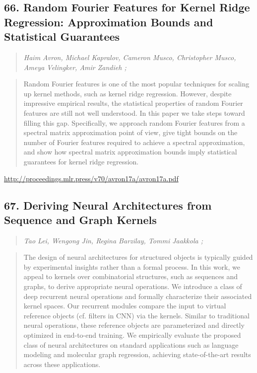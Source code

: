 \documentclass{article}
\begin{document}
\subsection{66. Random Fourier Features for Kernel Ridge Regression: Approximation Bounds and Statistical Guarantees}

\begin{quote}
\footnotesize{\textit{Haim Avron, Michael Kapralov, Cameron Musco, Christopher Musco, Ameya Velingker, Amir Zandieh ;}}

\end{quote}

\begin{quote}
    Random Fourier features is one of the most popular techniques for scaling up kernel methods, such as kernel ridge regression. However, despite impressive empirical results, the statistical properties of random Fourier features are still not well understood. In this paper we take steps toward filling this gap. Specifically, we approach random Fourier features from a spectral matrix approximation point of view, give tight bounds on the number of Fourier features required to achieve a spectral approximation, and show how spectral matrix approximation bounds imply statistical guarantees for kernel ridge regression.  
\end{quote}

\href{http://proceedings.mlr.press/v70/avron17a/avron17a.pdf}{http://proceedings.mlr.press/v70/avron17a/avron17a.pdf}

\subsection{67. Deriving Neural Architectures from Sequence and Graph Kernels}

\begin{quote}
\footnotesize{\textit{Tao Lei, Wengong Jin, Regina Barzilay, Tommi Jaakkola ;}}

\end{quote}

\begin{quote}
    The design of neural architectures for structured objects is typically guided by experimental insights rather than a formal process. In this work, we appeal to kernels over combinatorial structures, such as sequences and graphs, to derive appropriate neural operations. We introduce a class of deep recurrent neural operations and formally characterize their associated kernel spaces. Our recurrent modules compare the input to virtual reference objects (cf. filters in CNN) via the kernels. Similar to traditional neural operations, these reference objects are parameterized and directly optimized in end-to-end training. We empirically evaluate the proposed class of neural architectures on standard applications such as language modeling and molecular graph regression, achieving state-of-the-art results across these applications.  
\end{quote}
\end{document}
